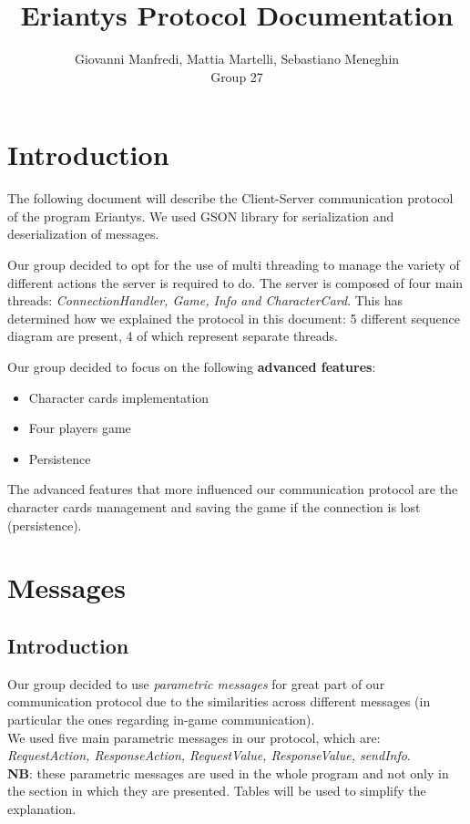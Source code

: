 \documentclass[12pt]{article}
\title{Eriantys Protocol Documentation}
\author{Giovanni Manfredi, Mattia Martelli, Sebastiano Meneghin  \\Group 27}
\date{}
\begin{document}
	
	\maketitle
	
	\section*{Introduction}
	
	The following document will describe the Client-Server communication protocol of the program Eriantys. We used GSON library for serialization and deserialization of messages.
	
	Our group decided to opt for the use of multi threading to manage the variety of different actions the server is required to do. The server is composed of four main threads: \textit{ConnectionHandler, Game, Info and CharacterCard}. This has determined how we explained the protocol in this document: 5 different sequence diagram are present, 4 of which represent separate threads.
	
	Our group decided to focus on the following \textbf{advanced features}:
	\begin{itemize}
		\item Character cards implementation
		\item Four players game
		\item Persistence
	\end{itemize}
	The advanced features that more influenced our communication protocol are the character cards management and saving the game if the connection is lost (persistence). 
	
	\newpage
	
	\section{Messages}
	
		\subsection*{Introduction}
	
		Our group decided to use \emph{parametric messages} for great part of our communication protocol due to the similarities across different messages (in particular the ones regarding in-game communication). \\
		We used five main parametric messages in our protocol, which are: \emph{RequestAction, ResponseAction, RequestValue, ResponseValue, sendInfo}. \\
		\textbf{NB}: these parametric messages are used in the whole program and not only in the section in which they are presented. Tables will be used to simplify the explanation. 
	
\end{document}
